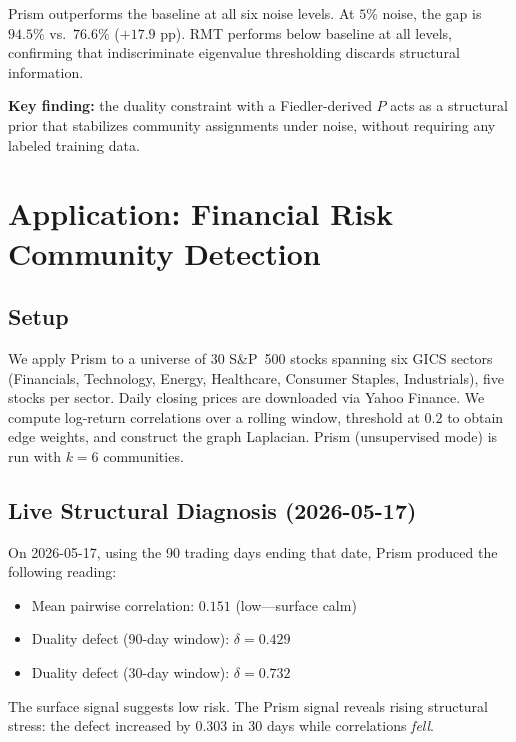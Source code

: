 \documentclass[11pt]{article}
\begin{document}
Prism outperforms the baseline at all six noise levels.
At $5\%$ noise, the gap is $94.5\%$ vs.\ $76.6\%$ ($+17.9$ pp).
RMT performs below baseline at all levels, confirming that
indiscriminate eigenvalue thresholding discards structural information.

\textbf{Key finding:} the duality constraint with a Fiedler-derived $P$
acts as a structural prior that stabilizes community assignments under
noise, without requiring any labeled training data.

\section{Application: Financial Risk Community Detection}
\label{sec:finance}

\subsection{Setup}

We apply Prism to a universe of 30 S\&P~500 stocks spanning six GICS
sectors (Financials, Technology, Energy, Healthcare, Consumer Staples,
Industrials), five stocks per sector.
Daily closing prices are downloaded via Yahoo Finance.
We compute log-return correlations over a rolling window, threshold at
$0.2$ to obtain edge weights, and construct the graph Laplacian.
Prism (unsupervised mode) is run with $k = 6$ communities.

\subsection{Live Structural Diagnosis (2026-05-17)}

On 2026-05-17, using the 90 trading days ending that date, Prism
produced the following reading:

\begin{itemize}
  \item Mean pairwise correlation: $0.151$ (low---surface calm)
  \item Duality defect (90-day window): $\delta = 0.429$
  \item Duality defect (30-day window): $\delta = 0.732$
\end{itemize}

The surface signal suggests low risk.
The Prism signal reveals rising structural stress: the defect increased
by $0.303$ in 30 days while correlations \emph{fell}.
\end{document}

